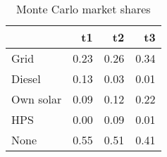 \begin{table}[!ht]
	\centering
		\caption{Monte Carlo market shares}
\begin{tabular}{lrrr}
		\toprule
               &        t1&        t2&        t3\\
		\midrule
		           Grid&      0.23&      0.26&      0.34\\
		         Diesel&      0.13&      0.03&      0.01\\
		      Own solar&      0.09&      0.12&      0.22\\
		            HPS&      0.00&      0.09&      0.01\\
		           None&      0.55&      0.51&      0.41\\
		\bottomrule
	\end{tabular}
\end{table}
